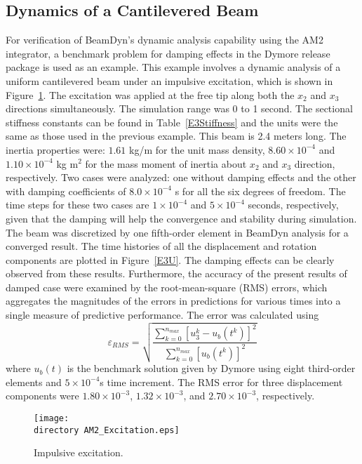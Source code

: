 \documentclass{aiaa-tc}
\def\directory{EPSF/}
\begin{document}
\subsection{Dynamics of a Cantilevered Beam}
For verification of BeamDyn's dynamic analysis capability using the AM2 integrator, a benchmark problem for damping effects in the Dymore release package is used as an example. This example involves a dynamic analysis of a uniform cantilevered beam under an impulsive excitation, which is shown in Figure~\ref{Impulsive}. The excitation was applied at the free tip along both the $x_2$ and $x_3$ directions simultaneously. The simulation range was 0 to 1 second. The sectional stiffness constants can be found in Table~\ref{E3Stiffness} and the units were the same as those used in the previous example. This beam is 2.4 meters long. The inertia properties were: $1.61$ kg/m for the unit mass density, $8.60 \times 10^{-4}$ and $1.10 \times 10^{-4}$ kg m$^{2}$ for the mass moment of inertia about $x_2$ and $x_3$ direction, respectively.   Two cases were analyzed: one without damping effects and the other with damping coefficients of $8.0 \times  10^{-4}$ s for all the six degrees of freedom. The time steps for these two cases are $1 \times 10^{-4}$ and $5 \times 10^{-4}$ seconds, respectively, given that the damping will help the convergence and stability during simulation. The beam was discretized by one fifth-order element in BeamDyn analysis for a converged result. The time histories of all the displacement and rotation components are plotted in Figure~\ref{E3U}. The damping effects can be clearly observed from these results. Furthermore, the accuracy of the present results of damped case were examined by the root-mean-square (RMS) errors, which aggregates the magnitudes of the errors in predictions for various times into a single measure of predictive performance. The error was calculated using
\begin{equation}
\varepsilon_{RMS}=\sqrt{\frac{\sum_{k=0}^{n_{max}}[u_3^k-u_b(t^k)]^2}{\sum_{k=0}^{n_{max}}[u_b(t^k)]^2}}
\label{RMSdefi}
\end{equation} 
where $u_b(t)$ is the benchmark solution given by Dymore using eight third-order elements and $5 \times 10^{-4}$s time increment. The RMS error for three displacement components were $1.80 \times 10^{-3}$, $1.32 \times 10^{-3}$, and $2.70 \times 10^{-3}$, respectively. 
 
\begin{figure}
\centering
\texttt{[image: \\directory AM2\_Excitation.eps]}
\caption{ Impulsive excitation.} 
\label{Impulsive}
\end{figure}
\end{document}
